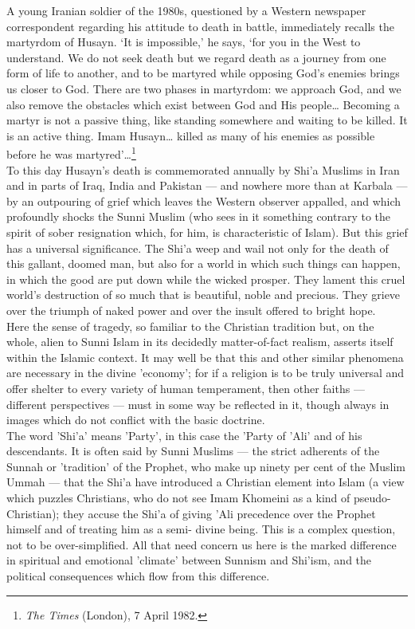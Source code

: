 \documentclass[10pt, twoside,openright]{book}
\begin{document}
A young Iranian soldier of the 1980s, questioned by a Western newspaper correspondent regarding his 
attitude to death in battle, immediately recalls the martyrdom of Husayn. `It is impossible,' he 
says, `for you in the West to understand. We do not seek death but we regard death as a journey from 
one form of life to another, and to be martyred while opposing God's enemies brings us closer to God. 
There are two phases in martyrdom: we approach God, and we also remove the obstacles which exist 
between God and His people\ldots{} Becoming a martyr is not a passive thing, like standing somewhere and 
waiting to be killed. It is an active thing. Imam Husayn\ldots{} killed as many of his enemies as possible 
before he was martyred'\ldots{}\footnote{\emph{The Times} (London), 7 April 1982.}\\

To this day Husayn's death is commemorated annually by Shi'a Muslims in Iran and in parts of Iraq, 
India and Pakistan --- and nowhere more than at Karbala --- by an outpouring of grief which leaves the 
Western observer appalled, and which profoundly shocks the Sunni Muslim (who sees in it something 
contrary to the spirit of sober resignation which, for him, is characteristic of Islam). But this 
grief has a universal significance. The Shi'a weep and wail not only for the death of this gallant, 
doomed man, but also for a world in which such things can happen, in which the good are put down 
while the wicked prosper. They lament this cruel world's destruction of so much that is beautiful, 
noble and precious. They grieve over the triumph of naked power and over the insult offered to bright 
hope. \\

Here the sense of tragedy, so familiar to the Christian tradition but, on the whole, alien to Sunni 
Islam in its decidedly matter\hyp{}of\hyp{}fact realism, asserts itself within the Islamic context. It may well 
be that this and other similar phenomena are necessary in the divine 'economy'; for if a religion is 
to be truly universal and offer shelter to every variety of human temperament, then other faiths --- 
different perspectives --- must in some way be reflected in it, though always in images which do not 
conflict with the basic doctrine. \\

The word 'Shi'a' means 'Party', in this case the 'Party of 'Ali' and of his descendants. It is often 
said by Sunni Muslims --- the strict adherents of the Sunnah or 'tradition' of the Prophet, who make up 
ninety per cent of the Muslim Ummah --- that the Shi'a have introduced a Christian element into Islam 
(a view which puzzles Christians, who do not see Imam Khomeini as a kind of pseudo\hyp{}Christian); they 
accuse the Shi'a of giving 'Ali precedence over the Prophet himself and of treating him as a semi\hyp{}
divine being. This is a complex question, not to be over\hyp{}simplified. All that need concern us here is 
the marked difference in spiritual and emotional 'climate' between Sunnism and Shi'ism, and the 
political consequences which flow from this difference. \\
\end{document}
